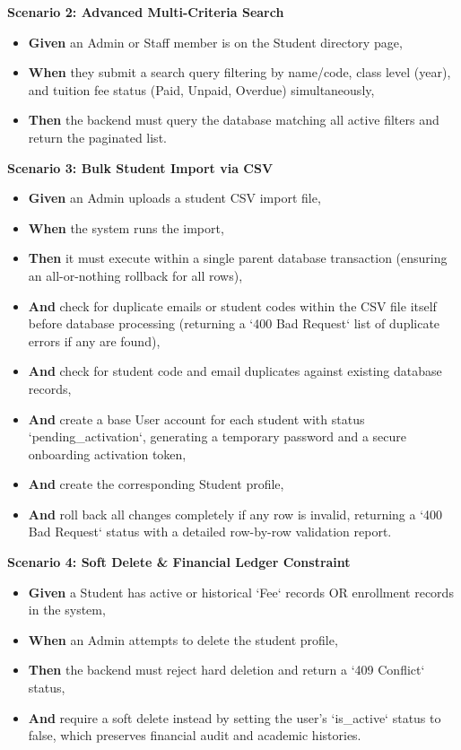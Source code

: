 \noindent\textbf{Scenario 2: Advanced Multi-Criteria Search}\\
\begin{itemize}
  \item \textbf{Given} an Admin or Staff member is on the Student directory page,
  \item \textbf{When} they submit a search query filtering by name/code, class level (year), and tuition fee status (Paid, Unpaid, Overdue) simultaneously,
  \item \textbf{Then} the backend must query the database matching all active filters and return the paginated list.
\end{itemize}


\noindent\textbf{Scenario 3: Bulk Student Import via CSV}\\
\begin{itemize}
  \item \textbf{Given} an Admin uploads a student CSV import file,
  \item \textbf{When} the system runs the import,
  \item \textbf{Then} it must execute within a single parent database transaction (ensuring an all-or-nothing rollback for all rows),
  \item \textbf{And} check for duplicate emails or student codes within the CSV file itself before database processing (returning a `400 Bad Request` list of duplicate errors if any are found),
  \item \textbf{And} check for student code and email duplicates against existing database records,
  \item \textbf{And} create a base User account for each student with status `pending\_activation`, generating a temporary password and a secure onboarding activation token,
  \item \textbf{And} create the corresponding Student profile,
  \item \textbf{And} roll back all changes completely if any row is invalid, returning a `400 Bad Request` status with a detailed row-by-row validation report.
\end{itemize}


\noindent\textbf{Scenario 4: Soft Delete \& Financial Ledger Constraint}\\
\begin{itemize}
  \item \textbf{Given} a Student has active or historical `Fee` records OR enrollment records in the system,
  \item \textbf{When} an Admin attempts to delete the student profile,
  \item \textbf{Then} the backend must reject hard deletion and return a `409 Conflict` status,
  \item \textbf{And} require a soft delete instead by setting the user's `is\_active` status to false, which preserves financial audit and academic histories.
\end{itemize}


